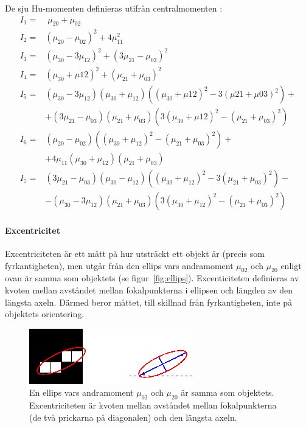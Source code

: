 \documentclass[../rapport_MVEX01-11-05]{subfiles}
\begin{document}
De sju Hu-momenten definieras utifrån centralmomenten \cite[s.~185]{Hu62}:
\begin{align*}
	I_1 =& \;\mu_{20} + \mu_{02}\\
	I_2 =& \left(\mu_{20} - \mu_{02}\right)^2 + 4\mu^2_{11}\\
	I_3 =& \left(\mu_{30} - 3\mu_{12}\right)^2 +
	       \left(3\mu_{21} - \mu_{03}\right)^2\\
	I_4 =& \left(\mu_{30} + \mu{12}\right)^2 +
 	       \left(\mu_{21} + \mu_{03}\right)^2\\
	I_5 =& \left(\mu_{30} - 3\mu_{12}\right)
	       \left(\mu_{30} + \mu_{12}\right)
	       \left(\left(\mu_{30}+\mu{12}\right)^2 -
	       3\left(\mu{21}+\mu{03}\right)^2\right) + \\
 	    &+ \left(3\mu_{21} - \mu_{03}\right)\left(\mu_{21} + \mu_{03}\right)
	       \left(3\left(\mu_{30} + \mu{12}\right)^2 -
	       \left(\mu_{21} + \mu_{03}\right)^2\right)\\
	I_6 =& \left(\mu_{20}-\mu_{02}\right)
	       \left(\left(\mu_{30}+\mu_{12}\right)^2 -
	       \left(\mu_{21}+\mu_{03}\right)^2\right) + \\
	    &+ 4\mu_{11}\left(\mu_{30}+\mu_{12}\right)
	       \left(\mu_{21}+\mu_{03}\right)\\
	I_7 =& \left(3\mu_{21}-\mu_{03}\right)\left(\mu_{30}-\mu_{12}\right)
	       \left(\left(\mu_{30}+\mu_{12}\right)^2 - 
	       3\left(\mu_{21}+\mu_{03}\right)^2\right) - \\
	    &- \left(\mu_{30} - 3\mu_{12}\right)\left(\mu_{21}+\mu_{03}\right)
	       \left(3\left(\mu_{30}+\mu_{12}\right)^2 - 
  	     \left(\mu_{21}+\mu_{03}\right)^2\right)
\end{align*}

\paragraph{Excentricitet}

Excentriciteten är ett mått på hur utsträckt ett objekt är (precis som
fyrkantigheten), men utgår från den ellips
vars andramoment $\mu_{02}$ och $\mu_{20}$ enligt ovan är samma som
objektets (se figur~\vref{fig:ellips}). Excenticiteten definieras av
kvoten mellan avståndet
mellan fokalpunkterna i ellipsen och längden av den längsta axeln. Därmed
beror måttet, till skillnad från fyrkantigheten, inte på objektets orientering.

\begin{figure}[hb]
	\centering 
	\includegraphics{bilder/matlab-ellips.png}
	\caption{En ellips vars andramoment $\mu_{02}$ och $\mu_{20}$ är samma
	som objektets. Excentriciteten är kvoten mellan avståndet
        mellan fokalpunkterna (de två prickarna på diagonalen) och den
        längsta axeln.}
	\label{fig:ellips}
\end{figure}
\end{document}
